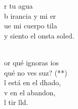 \documentclass[12pt]{article}
\begin{document}
\begin{multicols*}{2}
\begin{cancion}[Saulo][Nico]
	 r tu agua\\
	b irancia y mi er\\
	ue mi cuerpo tila \\
	y siento el onsta soled.\\\jump\\
	\begin{chorus}%
	or qué ignoras ios\\
	qué no ves suz? (**)\\
	l está en el dhado,\\
	v en el abandon,\\
	l tir lld.\\
	\end{chorus}%
	\jump\\
\end{cancion}%


\end{multicols*}
\end{document}
